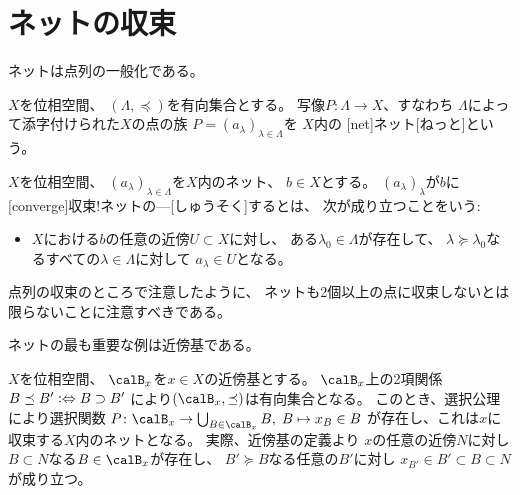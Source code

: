 \documentclass[report]{jlreq}
\begin{document}
%
\section{ネットの収束}

ネットは点列の一般化である。

\begin{definition}[ネット]
    $X$を位相空間、
    $(\Lambda, \preceq)$を有向集合とする。
    写像$P \colon \Lambda \to X$、すなわち
    $\Lambda$によって添字付けられた$X$の点の族
    $P = (a_\lambda)_{\lambda \in \Lambda}$を
    $X$内の
    [net]{ネット}[ねっと]という。
\end{definition}

\begin{definition}[ネットの収束]
    $X$を位相空間、
    $(a_\lambda)_{\lambda \in \Lambda}$を$X$内のネット、
    $b \in X$とする。
    $(a_\lambda)_\lambda$が$b$に
    [converge]{収束!ネットの---}[しゅうそく]するとは、
    次が成り立つことをいう:
    \begin{itemize}
        \item $X$における$b$の任意の近傍$U \subset X$に対し、
            ある$\lambda_0 \in \Lambda$が存在して、
            $\lambda \succeq \lambda_0$なるすべての$\lambda \in \Lambda$に対して
            $a_\lambda \in U$となる。
    \end{itemize}
\end{definition}

\begin{remark}
    点列の収束のところで注意したように、
    ネットも2個以上の点に収束しないとは限らないことに注意すべきである。
\end{remark}

ネットの最も重要な例は近傍基である。

\begin{example}[近傍基により定まるネット]
    $X$を位相空間、
    $\calB_x$を$x \in X$の近傍基とする。
    $\calB_x$上の2項関係
    $B \preceq B' \vcentcolon\Leftrightarrow B \supset B'$
    により$(\calB_x, \preceq)$は有向集合となる。
    このとき、選択公理により選択関数
    $P \colon \calB_x \to \bigcup_{B \in \calB_x} B, \;
        B \mapsto x_B \in B$
    が存在し、これは$x$に収束する$X$内のネットとなる。
    実際、近傍基の定義より
    $x$の任意の近傍$N$に対し
    $B \subset N$なる$B \in \calB_x$が存在し、
    $B' \succeq B$なる任意の$B'$に対し
    $x_{B'} \in B' \subset B \subset N$が成り立つ。
\end{example}
\end{document}
